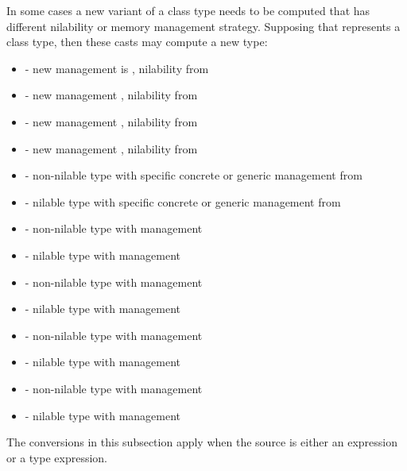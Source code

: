 In some cases a new variant of a class type needs to be computed that has
different nilability or memory management strategy. Supposing that
 represents a class type, then these casts may compute a new type:

\begin{itemize}
\item
{} - new management is , nilability from 

\item
{} - new management , nilability from 

\item
{} - new management , nilability from 

\item
{} - new management , nilability from 

\item
{} - non-nilable type with specific concrete or generic management from 

\item
{} - nilable type with specific concrete or generic management from 

\item
{} - non-nilable type with  management
\item
{} - nilable type with  management

\item
{} - non-nilable type with  management
\item
{} - nilable type with  management

\item
{} - non-nilable type with  management
\item
{} - nilable type with  management

\item
{} - non-nilable type with  management
\item
{} - nilable type with  management

\end{itemize}

The conversions in this subsection apply when the source is either an expression
or a type expression.


